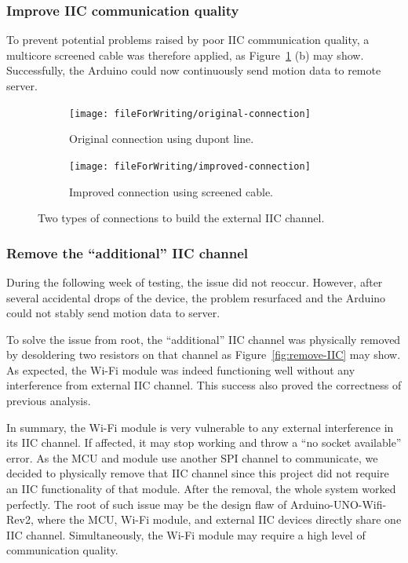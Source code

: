 \subsubsection{Improve IIC communication quality}

To prevent potential problems raised by poor IIC communication quality, a multicore screened cable was therefore applied, as Figure~\ref{fig:IIC-connections} (b) may show.
Successfully, the Arduino could now continuously send motion data to remote server.


\begin{figure}[htbp]
	\centering
	\begin{subfigure}[b]{0.45\textwidth}
		\centering
		\texttt{[image: fileForWriting/original-connection]}
		\caption{Original connection using dupont line.}
	\end{subfigure}
	\hfill
	\begin{subfigure}[b]{0.45\textwidth}
		\centering
		\texttt{[image: fileForWriting/improved-connection]}
		\caption{Improved connection using screened cable.}
	\end{subfigure}
	\caption[]{Two types of connections to build the external IIC channel.}
	\label{fig:IIC-connections}
\end{figure}

\subsubsection{Remove the ``additional'' IIC channel}
During the following week of testing, the issue did not reoccur.
However, after several accidental drops of the device, the problem resurfaced and the Arduino could not stably send motion data to server.

To solve the issue from root, the ``additional'' IIC channel was physically removed by desoldering two resistors on that channel as Figure~\ref{fig:remove-IIC} may show.
As expected, the Wi-Fi module was indeed functioning well without any interference from external IIC channel.
This success also proved the correctness of previous analysis.


In summary, the Wi-Fi module is very vulnerable to any external interference in its IIC channel.
If affected, it may stop working and throw a ``no socket available'' error.
As the MCU and module use another SPI channel to communicate, we decided to physically remove that IIC channel since this project did not require an IIC functionality of that module.
After the removal, the whole system worked perfectly.
The root of such issue may be the design flaw of Arduino-UNO-Wifi-Rev2, where the MCU, Wi-Fi module, and external IIC devices directly share one IIC channel.
Simultaneously, the Wi-Fi module may require a high level of communication quality.


